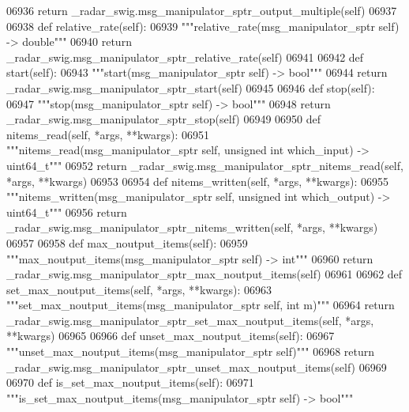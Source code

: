 \begin{DoxyCode}
{{{{{{{{{{{{{{{{{{{{{{{06936         \textcolor{keywordflow}{return} \_radar\_swig.msg\_manipulator\_sptr\_output\_multiple(self)
06937 
06938     \textcolor{keyword}{def }relative_rate(self):
06939         \textcolor{stringliteral}{"""relative\_rate(msg\_manipulator\_sptr self) -> double"""}
06940         \textcolor{keywordflow}{return} \_radar\_swig.msg\_manipulator\_sptr\_relative\_rate(self)
06941 
06942     \textcolor{keyword}{def }start(self):
06943         \textcolor{stringliteral}{"""start(msg\_manipulator\_sptr self) -> bool"""}
06944         \textcolor{keywordflow}{return} \_radar\_swig.msg\_manipulator\_sptr\_start(self)
06945 
06946     \textcolor{keyword}{def }stop(self):
06947         \textcolor{stringliteral}{"""stop(msg\_manipulator\_sptr self) -> bool"""}
06948         \textcolor{keywordflow}{return} \_radar\_swig.msg\_manipulator\_sptr\_stop(self)
06949 
06950     \textcolor{keyword}{def }nitems_read(self, *args, **kwargs):
06951         \textcolor{stringliteral}{"""nitems\_read(msg\_manipulator\_sptr self, unsigned int which\_input) -> uint64\_t"""}
06952         \textcolor{keywordflow}{return} \_radar\_swig.msg\_manipulator\_sptr\_nitems\_read(self, *args, **kwargs)
06953 
06954     \textcolor{keyword}{def }nitems_written(self, *args, **kwargs):
06955         \textcolor{stringliteral}{"""nitems\_written(msg\_manipulator\_sptr self, unsigned int which\_output) -> uint64\_t"""}
06956         \textcolor{keywordflow}{return} \_radar\_swig.msg\_manipulator\_sptr\_nitems\_written(self, *args, **kwargs)
06957 
06958     \textcolor{keyword}{def }max_noutput_items(self):
06959         \textcolor{stringliteral}{"""max\_noutput\_items(msg\_manipulator\_sptr self) -> int"""}
06960         \textcolor{keywordflow}{return} \_radar\_swig.msg\_manipulator\_sptr\_max\_noutput\_items(self)
06961 
06962     \textcolor{keyword}{def }set_max_noutput_items(self, *args, **kwargs):
06963         \textcolor{stringliteral}{"""set\_max\_noutput\_items(msg\_manipulator\_sptr self, int m)"""}
06964         \textcolor{keywordflow}{return} \_radar\_swig.msg\_manipulator\_sptr\_set\_max\_noutput\_items(self, *args, **kwargs)
06965 
06966     \textcolor{keyword}{def }unset_max_noutput_items(self):
06967         \textcolor{stringliteral}{"""unset\_max\_noutput\_items(msg\_manipulator\_sptr self)"""}
06968         \textcolor{keywordflow}{return} \_radar\_swig.msg\_manipulator\_sptr\_unset\_max\_noutput\_items(self)
06969 
06970     \textcolor{keyword}{def }is_set_max_noutput_items(self):
06971         \textcolor{stringliteral}{"""is\_set\_max\_noutput\_items(msg\_manipulator\_sptr self) -> bool"""}
}}}}}}}}}}}}}}}}}}}}}}}
\end{DoxyCode}
